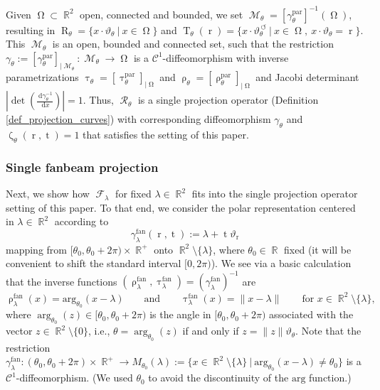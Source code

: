 \documentclass[12pt]{article}
\DeclareMathOperator{\RR}{{\mathbb{R}}}
\newcommand{\dd}[1]{\,\mathrm{d}{#1}}
\DeclareMathOperator{\Radon}{\mathcal{R}}
\DeclareMathOperator{\Fanbeam}{\mathcal{F}}
\DeclareMathOperator{\rotated}{\,\circlearrowleft}
\DeclareMathOperator{\tvariable}{t}
\DeclareMathOperator{\tgroundset}{T}
\DeclareMathOperator{\rayvariable}{r}
\DeclareMathOperator{\raygroundset}{R}
\DeclareMathOperator{\tinverse}{\tau}
\DeclareMathOperator{\rayinverse}{\rho}
\DeclareMathOperator{\weightfkt}{\zeta}
\DeclareMathOperator{\imgdom}{{\Omega}}
\DeclareMathOperator{\gammagroundset}{{\mathcal M}}
\begin{document}
Given $\imgdom \subset \RR^2$ open, connected  and bounded,
we set $\gammagroundset_{\theta}=[\gamma_{\theta}^\text{par}]^{-1}(\imgdom)$, resulting in  $\raygroundset_{\theta}=\{x\cdot \vartheta_{\theta}\ \big | \ x\in \imgdom\}$ and $\tgroundset_{\theta}(\rayvariable)= \{x \cdot \vartheta^{\rotated}_{\theta}\ \big |\ x\in \imgdom,\ x\cdot \vartheta_{\theta}=\rayvariable\}$.
This $\gammagroundset_{\theta}$ is an open, bounded and connected set, such that the restriction $\gamma_{\theta} := [\gamma_{\theta}^\text{par}] _{\big | \gammagroundset_{\theta}}\colon \gammagroundset_{\theta} \to \imgdom$ is a $\mathcal{C}^1$-diffeomorphism with inverse parametrizations $\tinverse_{\theta}=[\tinverse_{\theta}^\text{par}]_{\big| \imgdom }$ and $\rayinverse_{\theta}=[\rayinverse_{\theta}^\text{par}]_{\big| \imgdom }$ and Jacobi determinant $\left|\det\left(\frac{\dd \gamma_{\theta}^{-1}}{\dd x} \right)\right|=1$.
Thus, $\Radon_\theta $ is a single projection operator (Definition \ref{def_projection_curves}) with corresponding diffeomorphism $\gamma_\theta$ and $\weightfkt_\theta(\rayvariable,\tvariable)=1$ that satisfies the setting of this paper.



\subsubsection*{Single fanbeam projection}
Next, we show how $\Fanbeam_\lambda $ for fixed $\lambda\in \RR^2$ fits into the single projection operator setting of this paper.
To that end, we consider the polar representation centered in $\lambda\in \RR^2$ according to
 \begin{equation}\label{equ_definition_curve_fanbeam}
\gamma^\textrm{fan}_{\lambda}(\rayvariable,\tvariable):= \lambda+\tvariable \vartheta_{\rayvariable} 
 \end{equation}
mapping from $[\theta_0,\theta_0+2\pi) \times \RR^+$ onto $\RR^2\setminus \{\lambda\}$, where $\theta_0\in \RR$ fixed (it will be convenient to shift the standard interval $[0,2\pi)$).  
We see via a basic calculation that the inverse functions $(\rayinverse^\text{fan}_{\lambda},\tinverse^\text{fan}_{\lambda})= (\gamma_{\lambda}^{\text{fan}})^{-1}$ are
\begin{equation} \label{equ_fanbeam_basic_geometry_parametrization}
\rayinverse_{\lambda}^{\text{fan}}(x)= \text{arg}_{\theta_0}(x-\lambda) \qquad \text{and} \qquad \tinverse_{\lambda}^{\text{fan}}(x)=\|x-\lambda\| \qquad \text{for }x\in \RR^2 \setminus \{\lambda\},
\end{equation}
where $\arg_{\theta_0}(z) \in [\theta_0,\theta_0+2\pi)$ is the angle in $[\theta_0,\theta_0+2\pi)$ associated with the vector $z\in \RR^2\setminus\{0\}$, i.e., $\theta=\arg_{\theta_0}(z)$ if and only if $z=\|z\|\vartheta_\theta$. Note that the restriction $\gamma^\text{fan}_\lambda\colon (\theta_0,\theta_0+2\pi)\times \RR^+ \to M_{\theta_0}(\lambda):=\{x \in \RR^2\setminus \{\lambda\} \ \big| \ \text{arg}_{\theta_0}(x-\lambda)\neq \theta_0\}$ is a $\mathcal{C}^1$-diffeomorphism. (We used $\theta_0$ to avoid the discontinuity of the $\text{arg}$ function.)
\end{document}
